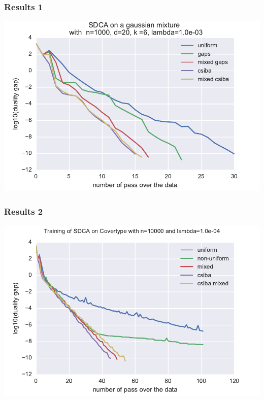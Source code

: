 \documentclass{beamer}
\DeclareMathOperator{\1}{\mathbb{1}}
\begin{document}
\begin{frame}
	\frametitle{Results 1}
	\includegraphics[width=\textwidth]{images/20170914_061831_gaussians_perf}
\end{frame}
\begin{frame}
	\frametitle{Results 2}
	\includegraphics[width=\textwidth]{images/20170914_065817_covertype_perf}
	
\end{frame}
\end{document}
